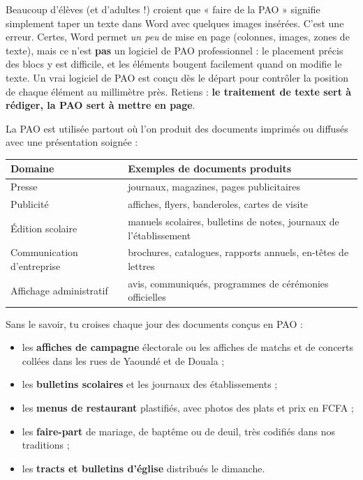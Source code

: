 \documentclass[11pt]{article}
\newcounter{popsec}
\newcounter{popsub}
\newcommand{\courssub}[1]{%
  \stepcounter{popsub}%
  \par\vspace{9pt}\noindent{\popxbold\fontsize{11.5}{13}\selectfont\color{popink}{\color{poporange}\thepopsec.\thepopsub}\hspace{6pt}#1}\par\nopagebreak\vspace{4pt}
}
\begin{document}
\begin{attention}
Beaucoup d'élèves (et d'adultes !) croient que « faire de la PAO » signifie simplement taper un texte dans Word avec quelques images insérées. C'est une erreur. Certes, Word permet \emph{un peu} de mise en page (colonnes, images, zones de texte), mais ce n'est \textbf{pas} un logiciel de PAO professionnel : le placement précis des blocs y est difficile, et les éléments bougent facilement quand on modifie le texte. Un vrai logiciel de PAO est conçu dès le départ pour contrôler la position de chaque élément au millimètre près. Retiens : \textbf{le traitement de texte sert à rédiger, la PAO sert à mettre en page}.
\end{attention}

\courssub{Domaines d'application de la PAO}

La PAO est utilisée partout où l'on produit des documents imprimés ou diffusés avec une présentation soignée :

\begin{center}
\begin{tabularx}{\linewidth}{|l|X|}
\hline
\rowcolor{popblueL} \textbf{Domaine} & \textbf{Exemples de documents produits} \\
\hline
Presse & journaux, magazines, pages publicitaires \\
\hline
Publicité & affiches, flyers, banderoles, cartes de visite \\
\hline
Édition scolaire & manuels scolaires, bulletins de notes, journaux de l'établissement \\
\hline
Communication d'entreprise & brochures, catalogues, rapports annuels, en-têtes de lettres \\
\hline
Affichage administratif & avis, communiqués, programmes de cérémonies officielles \\
\hline
\end{tabularx}
\end{center}

\begin{exemplebox}
Sans le savoir, tu croises chaque jour des documents conçus en PAO :
\begin{itemize}
\item les \textbf{affiches de campagne} électorale ou les affiches de matchs et de concerts collées dans les rues de Yaoundé et de Douala ;
\item les \textbf{bulletins scolaires} et les journaux des établissements ;
\item les \textbf{menus de restaurant} plastifiés, avec photos des plats et prix en FCFA ;
\item les \textbf{faire-part} de mariage, de baptême ou de deuil, très codifiés dans nos traditions ;
\item les \textbf{tracts et bulletins d'église} distribués le dimanche.
\end{itemize}
\end{exemplebox}
\end{document}
